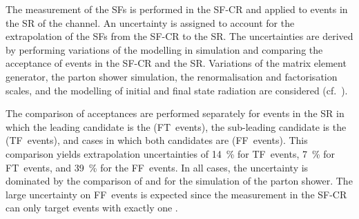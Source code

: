 

%   

The measurement of the SFs is performed in the SF-CR and applied to events in
the SR of the \hadhad channel. An uncertainty is assigned to account for the
extrapolation of the SFs from the SF-CR to the \hadhad SR. The
uncertainties are derived by performing variations of the \ttbar modelling in
simulation and comparing the acceptance of \ttbarFakes events in the SF-CR and
the \hadhad SR. Variations of the matrix element generator, the parton shower
simulation, the renormalisation and factorisation scales, and the modelling of
initial and final state radiation are considered
(cf.~).

The comparison of \ttbarFakes acceptances are performed separately for events in
the \hadhad SR in which the leading \tauhadvis candidate is the \faketauhadvis
(FT~events), the sub-leading \tauhadvis candidate is the \faketauhadvis
(TF~events), and cases in which both candidates are \faketauhadvis
(FF~events). This comparison yields extrapolation uncertainties of
\SI{14}{\percent} for TF~events, \SI{7}{\percent} for FT~events, and
\SI{39}{\percent} for the FF~events. In all cases, the uncertainty is dominated
by the comparison of \PYTHIA[8] and \HERWIG[7] for the simulation of the parton
shower. The large uncertainty on FF~events is expected since the measurement in
the SF-CR can only target events with exactly one \faketauhadvis.

